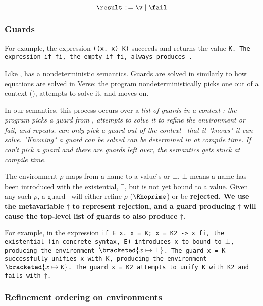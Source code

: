\documentclass[manuscript,screen,review, 12pt, nonacm]{acmart}
\begin{document}
    \[\result\; \rm{::=}\; \v\; \vert \; \fail \]
    
    \subsubsection{Guards}

    For example, the \VMinus expression {\tt{((}\ttbackslash\tt{x. x) K)}}
    succeeds and returns the value \tt{K}. The \VMinus expression \tt{if  fi},
    the empty \tt{if-fi}, always produces \fail. 

    Like \VC, \VMinus has a nondeterministic semantics. Guards are solved in \VMinus
    similarly to how equations are solved in Verse: the program nondeterministically
    picks one out of a context (\context), attempts to solve it, and moves on. 

In our semantics, this process occurs over a \it{list} of guards in a context
\context: the program picks a guard from \context, attempts to solve it to
refine the environment or fail, and repeats. \VMinus can only pick a guard out
of the context \context\ that it "knows" it can solve. "Knowing" a guard can be
solved can be determined in \VMinus at compile time. If \VMinus can't pick a
guard and there are guards left over, the semantics gets stuck at compile time. 



The environment $\rho$ maps from a name to a value {\v}s or $\bot$. $\bot$ means
a name has been introduced with the existential, $\exists$, but is not yet bound
to a value. Given any such $\rho$, a guard \g\ will either refine $\rho$
($\Rhoprime$) or be \bf{rejected}. We use the metavariable $\dagger$ to
represent rejection, and a guard producing $\dagger$ will cause the top-level
list of guards to also produce $\dagger$. 

    \gfail

  For example, in the \VMinus expression \tt{if E x. x = K; x = K2 -> x fi}, the
  existential (in concrete syntax, \tt{E}) introduces \tt{x} to \Rho bound to
  $\bot$, producing the environment $\bracketed{x \mapsto \bot}$. The guard
  \tt{x = K} successfully unifies \tt{x} with \tt{K}, producing the environment
  $\bracketed{x \mapsto \tt{K}}$. The guard \tt{x = K2} attempts to unify \tt{K}
  with \tt{K2} and fails with $\dagger$. 

    \subsubsection{Refinement ordering on environments}
\end{document}
